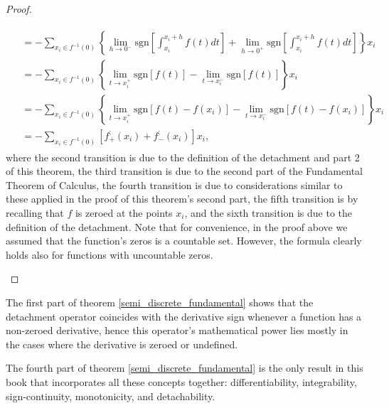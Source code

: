 \documentclass[11pt]{book}
\begin{document}
\begin{proof}
\begin{enumerate}
\begin{align}
\begin{aligned}
&= -\underset{x_{i}\in f^{-1}\left(0\right)}{\sum}\left\{ \underset{h\rightarrow0^{-}}{\lim}\text{sgn}\left[\int_{x_{i}}^{x_{i}+h}f\left(t\right)dt\right]+\underset{h\rightarrow0^{+}}{\lim}\text{sgn}\left[\int_{x_{i}}^{x_{i}+h}f\left(t\right)dt\right]\right\} x_{i}\\
&=-\underset{x_{i}\in f^{-1}\left(0\right)}{\sum}\left\{ \underset{t\rightarrow x_{i}^{+}}{\lim}\text{sgn}\left[f\left(t\right)\right]-\underset{t\rightarrow x_{i}^{-}}{\lim}\text{sgn}\left[f\left(t\right)\right]\right\} x_{i}\\
&=-\underset{x_{i}\in f^{-1}\left(0\right)}{\sum}\left\{ \underset{t\rightarrow x_{i}^{+}}{\lim}\text{sgn}\left[f\left(t\right)-f\left(x_{i}\right)\right]-\underset{t\rightarrow x_{i}^{-}}{\lim}\text{sgn}\left[f\left(t\right)-f\left(x_{i}\right)\right]\right\} x_{i}\\
&=-\underset{x_{i}\in f^{-1}\left(0\right)}{\sum}\left[f_{+}^{;}\left(x_{i}\right)+f_{-}^{;}\left(x_{i}\right)\right]x_{i},
\end{aligned}
\end{align}
where the second transition is due to the definition of the detachment and part 2 of this theorem, the third transition is due to the second part of the Fundamental Theorem of Calculus, the fourth transition is due to considerations similar to these applied in the proof of this theorem's second part, the fifth transition is by recalling that $f$ is zeroed at the points $x_{i}$, and the sixth transition is due to the definition of the detachment. Note that for convenience, in the proof above we assumed that the function's zeros is a countable set. However, the formula clearly holds also for functions with uncountable zeros.
\end{enumerate}
\end{proof}
\begin{remark}The first part of theorem \ref{semi_discrete_fundamental} shows that the detachment operator coincides with the derivative sign whenever a function has a non-zeroed derivative, hence this operator's mathematical power lies mostly in the cases where the derivative is zeroed or undefined.
\end{remark}
\begin{remark}The fourth part of theorem \ref{semi_discrete_fundamental} is the only result in this book that incorporates all these concepts together: differentiability, integrability, sign-continuity, monotonicity, and detachability.
\end{remark}
\end{document}
